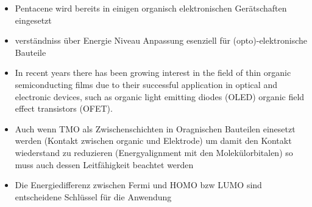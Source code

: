 \begin{itemize}
    \item Pentacene wird bereits in einigen organisch elektronischen Gerätschaften eingesetzt \cite{5A_4}
    \item verständniss über Energie Niveau Anpassung esenziell für (opto)-elektronische Bauteile
    \item In recent years there has been growing interest in the field of thin organic semiconducting films due to their successful application in optical and electronic devices, such as organic light emitting diodes (OLED) organic field effect transistors (OFET). \cite{Uni-Tübingen}
    \item Auch wenn TMO als Zwischenschichten in Oragnischen Bauteilen einesetzt werden (Kontakt zwischen organic und Elektrode) um damit den Kontakt wiederstand zu reduzieren (Energyalignment mit den Molekülorbitalen) so muss auch dessen Leitfähigkeit beachtet werden \cite{IF_11}
    \item Die Energiedifferenz zwischen Fermi und HOMO bzw LUMO sind entscheidene Schlüssel für die Anwendung \cite{5A_4}
\end{itemize}